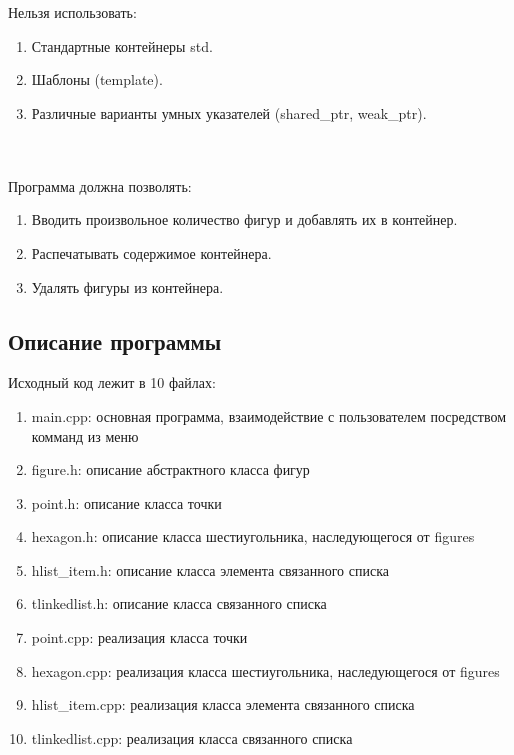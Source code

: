 \documentclass[12pt]{article}
\begin{document}
\\ \\
Нельзя использовать:
\begin{enumerate}
\item Стандартные контейнеры std.
\item Шаблоны (template).
\item Различные варианты умных указателей (shared\_ptr, weak\_ptr).
\end{enumerate}
\\ \\
Программа должна позволять:
\begin{enumerate}
\item Вводить произвольное количество фигур и добавлять их в контейнер.
\item Распечатывать содержимое контейнера.
\item Удалять фигуры из контейнера.
\end{enumerate}



\subsection*{Описание программы}

Исходный код лежит в 10 файлах:
\begin{enumerate}
\item main.cpp: основная программа, взаимодействие с пользователем посредством комманд из меню

\item figure.h:    описание абстрактного класса фигур

\item point.h:     описание класса точки
\item hexagon.h: описание класса шестиугольника, наследующегося от figures
\item hlist\_item.h: описание класса элемента связанного списка
\item tlinkedlist.h: описание класса связанного списка

\item point.cpp:     реализация класса точки
\item hexagon.cpp:  реализация класса шестиугольника, наследующегося от figures
\item hlist\_item.cpp: реализация класса элемента связанного списка
\item tlinkedlist.cpp: реализация класса связанного списка

\end{enumerate}
\end{document}
